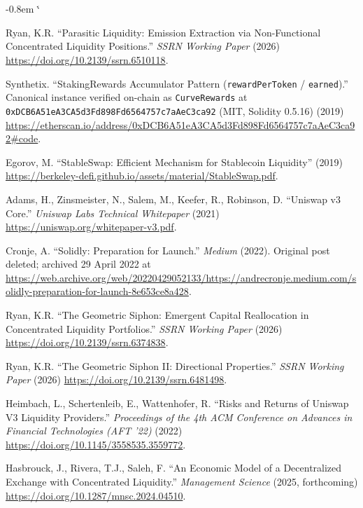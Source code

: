\documentclass[11pt,a4paper]{article}
\makeatletter
\renewenvironment{thebibliography}[1]
  {\section*{\refname}%
   \fontsize{10pt}{12pt}\selectfont
   \list{\@biblabel{\@arabic\c@enumiv}}%
        {\settowidth\labelwidth{\@biblabel{#1}}%
         \leftmargin\labelwidth
         \advance\leftmargin-0.8em
         \advance\leftmargin\labelsep
         \setlength\itemindent{1em}%
         \setlength\itemsep{6pt plus 1pt minus 1pt}%
         \setlength\parsep{0pt}%
         \usecounter{enumiv}%
         \let\p@enumiv\@empty
         \renewcommand\theenumiv{\@arabic\c@enumiv}}%
   \sloppy\clubpenalty4000\widowpenalty4000\sfcode`\.\@m}
  {\def\@noitemerr{\@latex@warning{Empty `thebibliography' environment}}%
   \endlist}
\def\UrlBreakPenalty{10000}
\def\UrlBigBreakPenalty{10000}
\theoremstyle{definition}
\theoremstyle{plain}
\theoremstyle{remark}
\makeatother
\begin{document}
\begin{thebibliography}{9}

Ryan, K.R. ``Parasitic Liquidity: Emission Extraction via Non-Functional Concentrated Liquidity Positions.'' \emph{SSRN Working Paper} (2026) \url{https://doi.org/10.2139/ssrn.6510118}.

Synthetix. ``StakingRewards Accumulator Pattern (\texttt{rewardPerToken} / \texttt{earned}).'' Canonical instance verified on-chain as \texttt{CurveRewards} at \texttt{0xDCB6A51eA3CA5d3Fd898Fd6564757c7aAeC3ca92} (MIT, Solidity 0.5.16) (2019) \url{https://etherscan.io/address/0xDCB6A51eA3CA5d3Fd898Fd6564757c7aAeC3ca92\#code}.

Egorov, M. ``StableSwap: Efficient Mechanism for Stablecoin Liquidity'' (2019) \url{https://berkeley-defi.github.io/assets/material/StableSwap.pdf}.

Adams, H., Zinsmeister, N., Salem, M., Keefer, R., Robinson, D. ``Uniswap v3 Core.'' \emph{Uniswap Labs Technical Whitepaper} (2021) \url{https://uniswap.org/whitepaper-v3.pdf}.

Cronje, A. ``Solidly: Preparation for Launch.'' \emph{Medium} (2022). Original post deleted; archived 29 April 2022 at {\def\UrlBreakPenalty{100}\def\UrlBigBreakPenalty{100}\url{https://web.archive.org/web/20220429052133/https://andrecronje.medium.com/solidly-preparation-for-launch-8e653ce8a428}}.%

Ryan, K.R. ``The Geometric Siphon: Emergent Capital Reallocation in Concentrated Liquidity Portfolios.'' \emph{SSRN Working Paper} (2026) \url{https://doi.org/10.2139/ssrn.6374838}.

Ryan, K.R. ``The Geometric Siphon II: Directional Properties.'' \emph{SSRN Working Paper} (2026) \url{https://doi.org/10.2139/ssrn.6481498}.

Heimbach, L., Schertenleib, E., Wattenhofer, R. ``Risks and Returns of Uniswap V3 Liquidity Providers.'' \emph{Proceedings of the 4th ACM Conference on Advances in Financial Technologies (AFT '22)} (2022) \url{https://doi.org/10.1145/3558535.3559772}.

Hasbrouck, J., Rivera, T.J., Saleh, F. ``An Economic Model of a Decentralized Exchange with Concentrated Liquidity.'' \emph{Management Science} (2025, forthcoming) \url{https://doi.org/10.1287/mnsc.2024.04510}.


\end{thebibliography}
\end{document}
